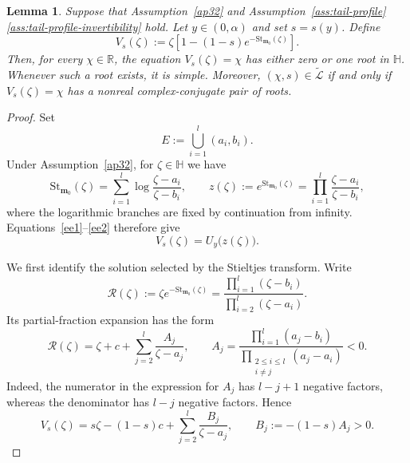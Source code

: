 \documentclass[11pt]{amsart}
\theoremstyle{plain}
\newtheorem{lemma}[theorem]{Lemma}
\newcommand\bm{\mathbf{m}}
\numberwithin{equation}{section}
\numberwithin{theorem}{section}
\numberwithin{figure}{section}
\begin{document}
\begin{lemma}
\label{lem:spectral-liquid-equivalence}
Suppose that Assumption~\ref{ap32} and
Assumption~\ref{ass:tail-profile}\ref{ass:tail-profile-invertibility}
hold. Let $y\in(0,\alpha)$ and set $s=s(y)$. Define
\begin{equation}
    V_s(\zeta)
    :=
    \zeta\left[
        1-(1-s)e^{-\mathrm{St}_{\bm_0}(\zeta)}
    \right].
    \label{dvy}
\end{equation}
Then, for every $\chi\in\mathbb R$, the equation
$V_s(\zeta)=\chi$ has either zero or one root in $\mathbb H$.
Whenever such a root exists, it is simple. Moreover,
$(\chi,s)\in\widetilde{\mathcal L}$ if and only if
$V_s(\zeta)=\chi$ has a nonreal complex-conjugate pair of roots.
\end{lemma}

\begin{proof}
Set
\[
    E:=\bigcup_{i=1}^{l}(a_i,b_i).
\]
Under Assumption~\ref{ap32}, for $\zeta\in\mathbb H$ we have
\begin{equation}
    \mathrm{St}_{\bm_0}(\zeta)
    =
    \sum_{i=1}^{l}
    \log\frac{\zeta-a_i}{\zeta-b_i},
    \qquad
    z(\zeta)
    :=
    e^{\mathrm{St}_{\bm_0}(\zeta)}
    =
    \prod_{i=1}^{l}
    \frac{\zeta-a_i}{\zeta-b_i},
    \label{eq:spectral-z-physical-proof}
\end{equation}
where the logarithmic branches are fixed by continuation from infinity.
Equations~\eqref{ee1}--\eqref{ee2} therefore give
\begin{equation}
    V_s(\zeta)=U_y\bigl(z(\zeta)\bigr).
    \label{eq:Vs-Uy-physical-proof}
\end{equation}

We first identify the solution selected by the Stieltjes transform.
Write
\[
    \mathscr R(\zeta)
    :=
    \zeta e^{-\mathrm{St}_{\bm_0}(\zeta)}
    =
    \frac{\prod_{i=1}^{l}(\zeta-b_i)}
         {\prod_{i=2}^{l}(\zeta-a_i)}.
\]
Its partial-fraction expansion has the form
\begin{equation}
    \mathscr R(\zeta)
    =
    \zeta+c+
    \sum_{j=2}^{l}\frac{A_j}{\zeta-a_j},
    \qquad
    A_j
    =
    \frac{\prod_{i=1}^{l}(a_j-b_i)}
         {\prod_{\substack{2\leq i\leq l\\i\neq j}}(a_j-a_i)}
    <0.
    \label{eq:R-partial-fraction-physical-proof}
\end{equation}
Indeed, the numerator in the expression for $A_j$ has
$l-j+1$ negative factors, whereas the denominator has $l-j$
negative factors. Hence
\begin{equation}
    V_s(\zeta)
    =
    s\zeta-(1-s)c+
    \sum_{j=2}^{l}\frac{B_j}{\zeta-a_j},
    \qquad
    B_j:=-(1-s)A_j>0.
    \label{eq:Vs-partial-fraction-physical-proof}
\end{equation}


\end{proof}
\end{document}
